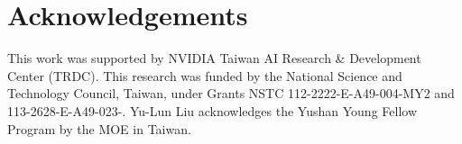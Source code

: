 \documentclass[runningheads]{llncs}
\begin{document}
\section*{Acknowledgements}
This work was supported by NVIDIA Taiwan AI Research \& Development Center (TRDC). This research was funded by the National Science and Technology Council, Taiwan, under Grants NSTC 112-2222-E-A49-004-MY2 and 113-2628-E-A49-023-. Yu-Lun Liu acknowledges the Yushan Young Fellow Program by the MOE in Taiwan.

%
%





\clearpage
\appendix

\end{document}
